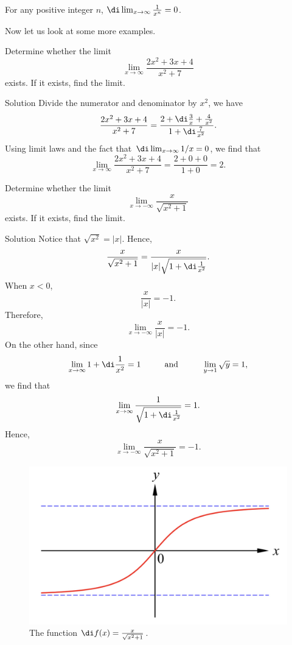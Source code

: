 \begin{example}{}
For any positive integer $n$, 
$\di \lim_{x\rightarrow\infty}\frac{1}{x^n}=0$.
\end{example}

Now let us look at some more examples.
\begin{example}{}
Determine whether the limit 
\[ \lim_{x\rightarrow\infty}\frac{2x^2+3x+4}{x^2+7}\]exists. If it  exists, find the limit.
 
\end{example}
\begin{solution}{Solution}
  Divide the numerator and denominator by $x^2$, we have
\[\frac{2x^2+3x+4}{x^2+7}=\frac{2+\di\frac{3}{x}+\frac{4}{x^2}}{1+\di\frac{7}{x^2}}.\]
Using limit laws and the fact that $\di\lim_{x\rightarrow\infty}1/x=0$, we find that
\[\lim_{x\rightarrow\infty}\frac{2x^2+3x+4}{x^2+7}=\frac{2+0+0}{1+0}=2.\]
 
\end{solution}

\begin{example}{}
Determine whether the limit 
\[  \lim_{x\rightarrow -\infty}\frac{x}{\sqrt{x^2+1}}\]exists. If it  exists, find the limit.

\end{example}

\begin{solution}{Solution}
  Notice that $\sqrt{x^2}=|x|$. Hence,
\[\frac{x}{\sqrt{x^2+1}}=\frac{x}{|x|\sqrt{1+\di\frac{1}{x^2}}}.\] 
When $x<0$, 
\[\frac{x}{|x|}=-1.\] 
Therefore,
\[\lim_{x\rightarrow-\infty}\frac{x}{|x|}=-1.\]On the other hand, since 
\[\lim_{x\rightarrow\infty}1+\di\frac{1}{x^2}=1\hspace{1cm}\text{and}\hspace{1cm}\lim_{y\rightarrow 1}\sqrt{y}=1,\] we find that
\[\lim_{x\rightarrow\infty}\frac{1}{\sqrt{1+\di\frac{1}{x^2}}}=1.\]Hence,
\[\lim_{x\rightarrow -\infty}\frac{x}{\sqrt{x^2+1}}=-1.\]
 
 
\end{solution}

 \begin{figure}[ht]
\centering
\includegraphics[scale=0.2]{Picture9.png}
\caption{  The function $\di f(x)=\frac{x}{\sqrt{x^2+1}}$.}\label{figure9}
\end{figure}

